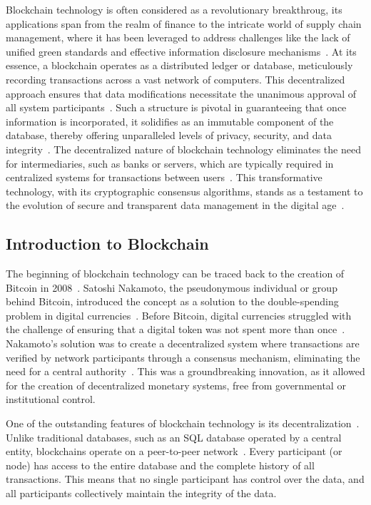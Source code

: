 Blockchain technology is often considered as a revolutionary breakthroug, its applications span from the realm of finance to the intricate world of supply chain management, where it has been leveraged to address challenges like the lack of unified green standards and effective information disclosure mechanisms~\cite{Zhou.2023}. At its essence, a blockchain operates as a distributed ledger or database, meticulously recording transactions across a vast network of computers. This decentralized approach ensures that data modifications necessitate the unanimous approval of all system participants~\cite{Zhang.2022}. Such a structure is pivotal in guaranteeing that once information is incorporated, it solidifies as an immutable component of the database, thereby offering unparalleled levels of privacy, security, and data integrity~\cite{Pingale.2021}. The decentralized nature of blockchain technology eliminates the need for intermediaries, such as banks or servers, which are typically required in centralized systems for transactions between users~\cite{Pingale.2021}. This transformative technology, with its cryptographic consensus algorithms, stands as a testament to the evolution of secure and transparent data management in the digital age~\cite{Pingale.2021}.

\subsection{Introduction to Blockchain}
The beginning of blockchain technology can be traced back to the creation of Bitcoin in 2008~\cite{Nakamoto.2009}. Satoshi Nakamoto, the pseudonymous individual or group behind Bitcoin, introduced the concept as a solution to the double-spending problem in digital currencies~\cite{Nakamoto.2009}. Before Bitcoin, digital currencies struggled with the challenge of ensuring that a digital token was not spent more than once~\cite{Chiu.2022}. Nakamoto's solution was to create a decentralized system where transactions are verified by network participants through a consensus mechanism, eliminating the need for a central authority~\cite{Chiu.2022}. This was a groundbreaking innovation, as it allowed for the creation of decentralized monetary systems, free from governmental or institutional control.

One of the outstanding features of blockchain technology is its decentralization~\cite{Gencer.2018}. Unlike traditional databases, such as an SQL database operated by a central entity, blockchains operate on a peer-to-peer network~\cite{Gencer.2018}. Every participant (or node) has access to the entire database and the complete history of all transactions. This means that no single participant has control over the data, and all participants collectively maintain the integrity of the data.

